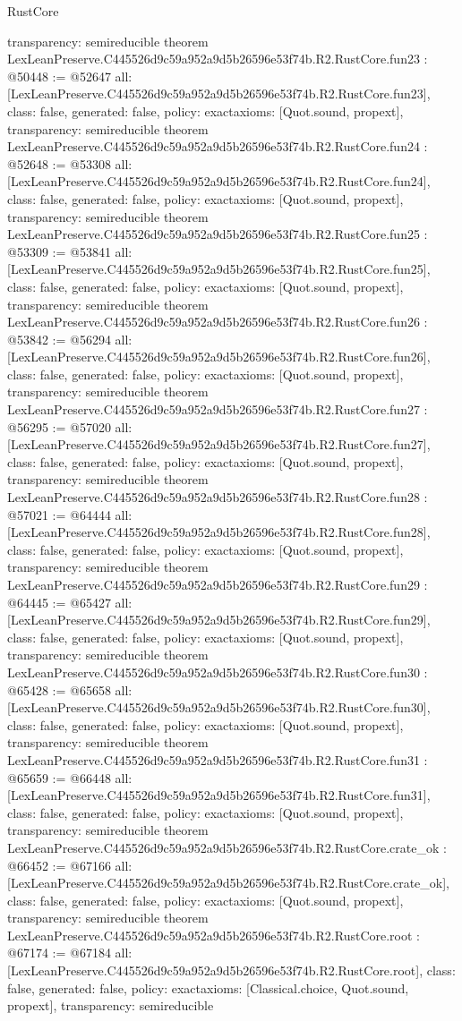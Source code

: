 \begin{lexlean}{RustCore}
\begin{coremodule}
{  transparency: semireducible
}
theorem LexLeanPreserve.C445526d9c59a952a9d5b26596e53f74b.R2.RustCore.fun23 : @50448 := @52647 {
  all: [LexLeanPreserve.C445526d9c59a952a9d5b26596e53f74b.R2.RustCore.fun23],
  class: false,
  generated: false,
  policy: exact{axioms: [Quot.sound, propext]},
  transparency: semireducible
}
theorem LexLeanPreserve.C445526d9c59a952a9d5b26596e53f74b.R2.RustCore.fun24 : @52648 := @53308 {
  all: [LexLeanPreserve.C445526d9c59a952a9d5b26596e53f74b.R2.RustCore.fun24],
  class: false,
  generated: false,
  policy: exact{axioms: [Quot.sound, propext]},
  transparency: semireducible
}
theorem LexLeanPreserve.C445526d9c59a952a9d5b26596e53f74b.R2.RustCore.fun25 : @53309 := @53841 {
  all: [LexLeanPreserve.C445526d9c59a952a9d5b26596e53f74b.R2.RustCore.fun25],
  class: false,
  generated: false,
  policy: exact{axioms: [Quot.sound, propext]},
  transparency: semireducible
}
theorem LexLeanPreserve.C445526d9c59a952a9d5b26596e53f74b.R2.RustCore.fun26 : @53842 := @56294 {
  all: [LexLeanPreserve.C445526d9c59a952a9d5b26596e53f74b.R2.RustCore.fun26],
  class: false,
  generated: false,
  policy: exact{axioms: [Quot.sound, propext]},
  transparency: semireducible
}
theorem LexLeanPreserve.C445526d9c59a952a9d5b26596e53f74b.R2.RustCore.fun27 : @56295 := @57020 {
  all: [LexLeanPreserve.C445526d9c59a952a9d5b26596e53f74b.R2.RustCore.fun27],
  class: false,
  generated: false,
  policy: exact{axioms: [Quot.sound, propext]},
  transparency: semireducible
}
theorem LexLeanPreserve.C445526d9c59a952a9d5b26596e53f74b.R2.RustCore.fun28 : @57021 := @64444 {
  all: [LexLeanPreserve.C445526d9c59a952a9d5b26596e53f74b.R2.RustCore.fun28],
  class: false,
  generated: false,
  policy: exact{axioms: [Quot.sound, propext]},
  transparency: semireducible
}
theorem LexLeanPreserve.C445526d9c59a952a9d5b26596e53f74b.R2.RustCore.fun29 : @64445 := @65427 {
  all: [LexLeanPreserve.C445526d9c59a952a9d5b26596e53f74b.R2.RustCore.fun29],
  class: false,
  generated: false,
  policy: exact{axioms: [Quot.sound, propext]},
  transparency: semireducible
}
theorem LexLeanPreserve.C445526d9c59a952a9d5b26596e53f74b.R2.RustCore.fun30 : @65428 := @65658 {
  all: [LexLeanPreserve.C445526d9c59a952a9d5b26596e53f74b.R2.RustCore.fun30],
  class: false,
  generated: false,
  policy: exact{axioms: [Quot.sound, propext]},
  transparency: semireducible
}
theorem LexLeanPreserve.C445526d9c59a952a9d5b26596e53f74b.R2.RustCore.fun31 : @65659 := @66448 {
  all: [LexLeanPreserve.C445526d9c59a952a9d5b26596e53f74b.R2.RustCore.fun31],
  class: false,
  generated: false,
  policy: exact{axioms: [Quot.sound, propext]},
  transparency: semireducible
}
theorem LexLeanPreserve.C445526d9c59a952a9d5b26596e53f74b.R2.RustCore.crate_ok : @66452 := @67166 {
  all: [LexLeanPreserve.C445526d9c59a952a9d5b26596e53f74b.R2.RustCore.crate_ok],
  class: false,
  generated: false,
  policy: exact{axioms: [Quot.sound, propext]},
  transparency: semireducible
}
theorem LexLeanPreserve.C445526d9c59a952a9d5b26596e53f74b.R2.RustCore.root : @67174 := @67184 {
  all: [LexLeanPreserve.C445526d9c59a952a9d5b26596e53f74b.R2.RustCore.root],
  class: false,
  generated: false,
  policy: exact{axioms: [Classical.choice, Quot.sound, propext]},
  transparency: semireducible
}


\end{coremodule}
\end{lexlean}
